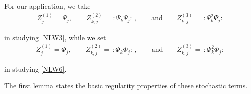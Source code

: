 \documentclass[letterpaper, 11pt,  reqno]{amsart}
\newcommand{\1}{\hspace{0.5mm}\text{I}\hspace{0.2mm}}
\newcommand{\noi}{\noindent}
\newcommand{\wick}[1]{:\!{#1}\!:}
\numberwithin{equation}{section}
\numberwithin{theorem}{section}
\begin{document}
\noi
For our application, we take
\begin{align}
Z_j^{(1)} = \Psi_j,\qquad   Z_{k, j}^{(2)} = \, \wick{\Psi_k \Psi_j} \, , 
\qquad \text{and}\qquad 
Z_{k, j}^{(3)}
=  \, \wick{\Psi_k^2 \Psi_j} 
\label{X2}
\end{align}

\noi
in studying 
\eqref{NLW3}, 
while we set 
\begin{align}
Z_j^{(1)} = \Phi_j,\qquad   Z_{k, j}^{(2)} = \, \wick{\Phi_k \Phi_j} \,, 
\qquad \text{and}\qquad 
Z_{k, j}^{(3)}
=  \, \wick{\Phi_k^2 \Phi_j}
\label{X3}
\end{align}


\noi
in studying 
\eqref{NLW6}.





The first lemma states the basic regularity properties
of these stochastic terms.
\end{document}
